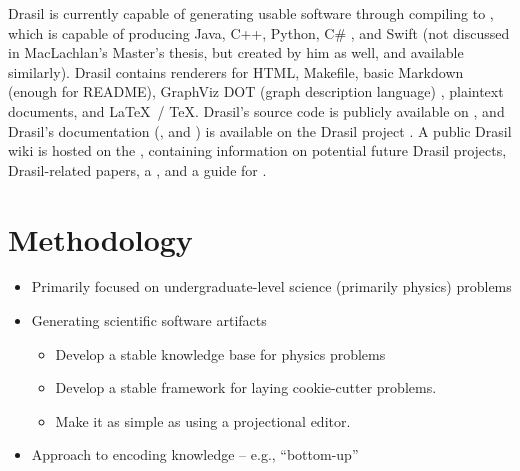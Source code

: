 Drasil is currently capable of generating usable software through compiling to
, which is capable of producing Java, C++, Python, C\#
\cite{MacLachlan2020}, and Swift (not discussed in MacLachlan's Master's thesis,
but created by him as well, and available similarly). Drasil contains renderers
for HTML, Makefile, basic Markdown (enough for README), GraphViz DOT (graph
description language) , plaintext documents, and \LaTeX\ / \TeX.
Drasil's source code is publicly available on
, and Drasil's
documentation
(,
and
)
is available on the Drasil project
. A public Drasil
wiki is hosted on the , containing information
on potential future Drasil projects, Drasil-related papers, a
, and a
guide for .

\section{Methodology}

\begin{itemize}

      \item Primarily focused on undergraduate-level science (primarily physics)
            problems

      \item Generating scientific software artifacts
            \begin{itemize}
                  \item Develop a stable knowledge base for physics problems

                  \item Develop a stable framework for laying cookie-cutter
                        problems.

                  \item Make it as simple as using a projectional editor.

            \end{itemize}

      \item Approach to encoding knowledge -- e.g., ``bottom-up''

\end{itemize}

